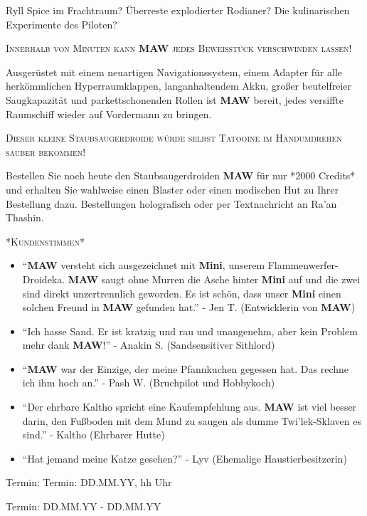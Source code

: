 \documentclass[final]{multiversum}
\begin{document}
Ryll Spice im Frachtraum?
Überreste explodierter Rodianer?
Die kulinarischen Experimente des Piloten?
\begin{center}\textsc{Innerhalb von Minuten kann \textbf{MAW} jedes Beweisstück verschwinden lassen!}\\\end{center}
Ausgerüstet mit einem neuartigen Navigationssystem, einem Adapter für alle herkömmlichen Hyperraumklappen, langanhaltendem Akku, großer beutelfreier Saugkapazität und parkettschonenden Rollen ist \textbf{MAW} bereit, jedes versiffte Raumschiff wieder auf Vordermann zu bringen.
\begin{center}\textsc{Dieser kleine Staubsaugerdroide würde selbst Tatooine im Handumdrehen sauber bekommen!}\\\end{center}
Bestellen Sie noch heute den Staubsaugerdroiden \textbf{MAW} für nur *2000 Credits* und erhalten Sie wahlweise einen Blaster oder einen modischen Hut zu Ihrer Bestellung dazu. 
Bestellungen holografisch oder per Textnachricht an Ra'an Thashin.\\
\begin{center}\textsc{*Kundenstimmen*}\\\end{center}
\begin{itemize}
\item \enquote{\textbf{MAW} versteht sich ausgezeichnet mit \textbf{Mini}, unserem Flammenwerfer-Droideka.
      \textbf{MAW} saugt ohne Murren die Asche hinter \textbf{Mini} auf und die zwei sind direkt unzertrennlich geworden. 
      Es ist schön, dass unser \textbf{Mini} einen solchen Freund in \textbf{MAW} gefunden hat.}
      - Jen T. (Entwicklerin von \textbf{MAW})
\item \enquote{Ich hasse Sand. 
      Er ist kratzig und rau und unangenehm, aber kein Problem mehr dank \textbf{MAW}!}
      - Anakin S. (Sandsensitiver Sithlord)
\item \enquote{\textbf{MAW} war der Einzige, der meine Pfannkuchen gegessen hat.
      Das rechne ich ihm hoch an.}
      - Pash W. (Bruchpilot und Hobbykoch)
\item \enquote{Der ehrbare Kaltho spricht eine Kaufempfehlung aus.
      \textbf{MAW} ist viel besser darin, den Fußboden mit dem Mund zu saugen als dumme Twi'lek-Sklaven es sind.}
      - Kaltho (Ehrbarer Hutte)
\item \enquote{Hat jemand meine Katze gesehen?}
      - Lyv (Ehemalige Haustierbesitzerin)
\end{itemize}


\begin{termine}
\item Termin: Termin: DD.MM.YY, hh Uhr
  \item Termin: DD.MM.YY - DD.MM.YY
\end{termine}
\impressum
\end{document}

